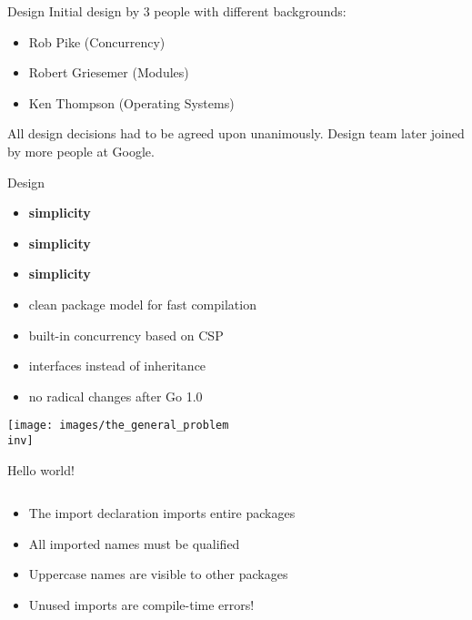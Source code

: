 \documentclass[10pt]{beamer}
\newcommand{\inv}{-inv}
\begin{document}
	\begin{frame}{Design}
		Initial design by 3 people with different backgrounds:
		\begin{itemize}
			\item Rob Pike (Concurrency)
			\item Robert Griesemer (Modules)
			\item Ken Thompson (Operating Systems)
		\end{itemize}
		All design decisions had to be agreed upon unanimously.
		Design team later joined by more people at Google.
	\end{frame}
	
	
	\begin{frame}{Design}
		\begin{itemize}
			\item \textbf{simplicity}
			\item \textbf{simplicity}
			\item \textbf{simplicity}
			\item clean package model for fast compilation
			\item built-in concurrency based on CSP
			\item interfaces instead of inheritance
			\item no radical changes after Go 1.0
		\end{itemize}
	\end{frame}
	
	
	\begin{frame}
		\begin{center}
			\texttt{[image: images/the\_general\_problem\\inv]}
		\end{center}
	\end{frame}
	
	
	\begin{frame}[fragile]{Hello world!}
		\inputminted{go}{code/01_hello.go}
		\begin{itemize}
			\item The import declaration imports entire packages
			\item All imported names must be qualified
			\item Uppercase names are visible to other packages
			\item Unused imports are compile-time errors!
		\end{itemize}
\end{frame}
	
\end{document}
